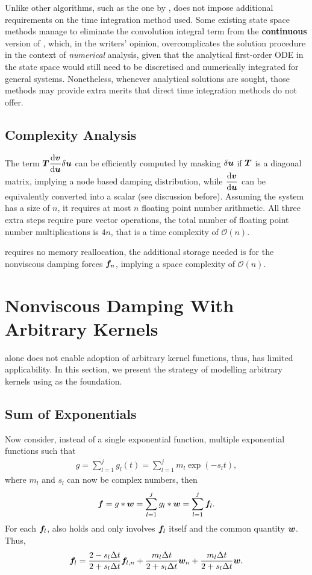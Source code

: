Unlike other algorithms, such as the one by \citet{Cortes2009},  does not impose additional requirements on the time integration method used. Some existing state space methods manage to eliminate the convolution integral term from the \textbf{continuous} version of  \citep[see][]{Wagner2003,Wu2019}, which, in the writers' opinion, overcomplicates the solution procedure in the context of \textit{numerical} analysis, given that the analytical first-order ODE in the state space would still need to be discretised \citep{Adhikari2004} and numerically integrated for general systems. Nonetheless, whenever analytical solutions are sought, those methods may provide extra merits that direct time integration methods do not offer.
\subsection{Complexity Analysis}
The term $\bm{T}\dfrac{\mathrm{d}\bm{v}}{\mathrm{d}\bm{u}}\delta\bm{u}$ can be efficiently computed by masking $\delta\bm{u}$ if $\bm{T}$ is a diagonal matrix, implying a node based damping distribution, while $\dfrac{\mathrm{d}\bm{v}}{\mathrm{d}\bm{u}}$ can be equivalently converted into a scalar (see discussion before). Assuming the system has a size of $n$, it requires at most $n$ floating point number arithmetic. All three extra steps require pure vector operations, the total number of floating point number multiplications is $4n$, that is a time complexity of $\mathcal{O}\left(n\right)$.

 requires no memory reallocation, the additional storage needed is for the nonviscous damping forces $\bm{f}_n$, implying a space complexity of $\mathcal{O}\left(n\right)$.
\section{Nonviscous Damping With Arbitrary Kernels}\label{sec:arbitrary}
 alone does not enable adoption of arbitrary kernel functions, thus, has limited applicability. In this section, we present the strategy of modelling arbitrary kernels using  as the foundation.
\subsection{Sum of Exponentials}
Now consider, instead of a single exponential function, multiple exponential functions such that
\begin{gather}\label{eq:sum_exp}
g=\sum_{l=1}^{j}g_l\left(t\right)=\sum_{l=1}^{j}m_l\exp\left(-s_lt\right),
\end{gather}
where $m_l$ and $s_l$ can now be complex numbers, then
\begin{gather}\label{eq:sum_conv}
\bm{f}=g*\bm{w}=\sum_{l=1}^{j}g_l*\bm{w}=\sum_{l=1}^{j}\bm{f}_l.
\end{gather}
For each $\bm{f}_l$,  also holds and only involves $\bm{f}_l$ itself and the common quantity $\bm{w}$. Thus,
\begin{gather}
\bm{f}_l=\dfrac{2-s_l\Delta{}t}{2+s_l\Delta{}t}\bm{f}_{l,n}+\dfrac{m_l\Delta{}t}{2+s_l\Delta{}t}\bm{w}_n+\dfrac{m_l\Delta{}t}{2+s_l\Delta{}t}\bm{w}.
\end{gather}

